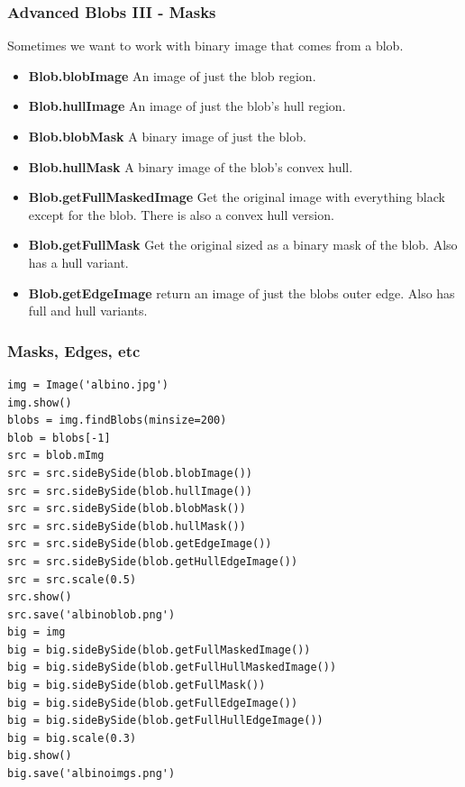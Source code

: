 \documentclass{beamer}
\begin{document}
\begin{frame}
  \frametitle{Advanced Blobs III - Masks}
Sometimes we want to work with binary image that comes from a blob.
\begin{itemize}
\item \textbf{Blob.blobImage} An image of just the blob region.
\item \textbf{Blob.hullImage} An image of just the blob's hull region.
\item \textbf{Blob.blobMask} A binary image of just the blob.
\item \textbf{Blob.hullMask} A binary image of the blob's convex hull.
\item \textbf{Blob.getFullMaskedImage} Get the original image with
  everything black except for the blob. There is also a convex hull version.
\item \textbf{Blob.getFullMask} Get the original sized as a binary
  mask of the blob. Also has a hull variant.
\item \textbf{Blob.getEdgeImage} return an image of just the blobs
  outer edge. Also has full and hull variants. 
\end{itemize}
\end{frame}
\begin{frame}[fragile] 
\frametitle{Masks, Edges, etc}
\begin{example}
\begin{verbatim}
img = Image('albino.jpg')
img.show()
blobs = img.findBlobs(minsize=200)
blob = blobs[-1]
src = blob.mImg
src = src.sideBySide(blob.blobImage())
src = src.sideBySide(blob.hullImage())
src = src.sideBySide(blob.blobMask())
src = src.sideBySide(blob.hullMask())
src = src.sideBySide(blob.getEdgeImage())
src = src.sideBySide(blob.getHullEdgeImage())
src = src.scale(0.5)
src.show()
src.save('albinoblob.png')
big = img
big = big.sideBySide(blob.getFullMaskedImage())
big = big.sideBySide(blob.getFullHullMaskedImage())
big = big.sideBySide(blob.getFullMask())
big = big.sideBySide(blob.getFullEdgeImage())
big = big.sideBySide(blob.getFullHullEdgeImage())
big = big.scale(0.3)
big.show()
big.save('albinoimgs.png')
\end{verbatim}
\end{example}
\end{frame}
\end{document}
